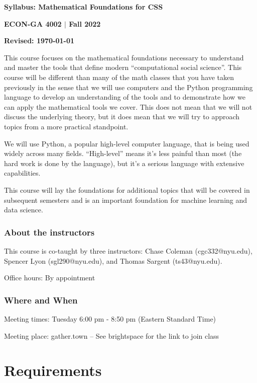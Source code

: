 \documentclass[12pt,pdftex,twoside,letterpaper]{exam}
\begin{document}
  \centerline{\Large\bf Syllabus: Mathematical Foundations for CSS}
  \vspace{3mm}
  \centerline{\large\bf ECON-GA 4002 $|$ Fall 2022}
  \vspace{3mm}
  \centerline{\bf Revised: \today}

  \bigskip

  This course focuses on the mathematical foundations necessary to understand and master the tools
  that define modern ``computational social science''. This course will be different than many of
  the math classes that you have taken previously in the sense that we will use computers and the
  Python programming language to develop an understanding of the tools and to demonstrate how we
  can apply the mathematical tools we cover. This does not mean that we will not discuss the
  underlying theory, but it does mean that we will try to approach topics from a more practical
  standpoint.

  We will use Python, a popular high-level computer language, that is being used widely across many
  fields. ``High-level'' means it's less painful than most (the hard work is done by the language),
  but it's a serious language with extensive capabilities.

  This course will lay the foundations for additional topics that will be covered in subsequent
  semesters and is an important foundation for machine learning and data science.

  \subsubsection*{About the instructors}

    This course is co-taught by three instructors: Chase Coleman (cgc332@nyu.edu), Spencer Lyon
    (sgl290@nyu.edu), and Thomas Sargent (ts43@nyu.edu).

    Office hours: By appointment

  \subsubsection*{Where and When}

    Meeting times: Tuesday 6:00 pm - 8:50 pm (Eastern Standard Time)

    Meeting place: gather.town -- See brightspace for the link to join class

  \section*{Requirements}
\end{document}
